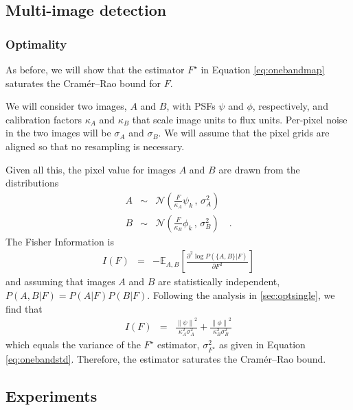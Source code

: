 \documentclass[letterpaper,preprint]{aastex62}
\newcommand{\drawnfrom}{\sim}
\newcommand{\gaussianN}{\mathcal{N}}
\newcommand{\gaussx}[2]{\gaussianN\!\left(#1 \, , \, #2\right)}
\newcommand{\norm}[1]{\left\lVert #1 \right\rVert}
\begin{document}
\subsection{Multi-image detection}
\label{app:multidet}

\subsubsection{Optimality}
\label{app:multiopt}
As before, we will show that the estimator $F^{\star}$ in
Equation \ref{eq:onebandmap} saturates the Cram\'er--Rao bound for $F$.

We will consider two images, $A$ and $B$, with PSFs $\psi$ and $\phi$,
respectively, and calibration factors $\kappa_A$ and $\kappa_B$ that
scale image units to flux units.  Per-pixel noise in the two images
will be $\sigma_A$ and $\sigma_B$.  We will assume that the pixel
grids are aligned so that no resampling is necessary.

Given all this, the pixel value for images $A$ and $B$ are drawn from
the distributions
\begin{eqnarray}
  A & \drawnfrom & \gaussx{\frac{F}{\kappa_A} \psi_k}{\sigma_A^2} \\
  B & \drawnfrom & \gaussx{\frac{F}{\kappa_B} \phi_k}{\sigma_B^2}
  \quad .
\end{eqnarray}
The Fisher Information is
\begin{eqnarray}
  I(F) &=& -\mathbb{E}_{A,B} \left[ \frac{\partial^2 \log P(\{ A,B \} | F)}{\partial F^2} \right]
\end{eqnarray}
and assuming that images $A$ and $B$ are statistically independent,
$P(A,B | F) = P(A|F) P(B|F)$.  Following the analysis in
\ref{sec:optsingle}, we find that
\begin{eqnarray}
  I(F) &=& \frac{\norm{\psi}^2}{\kappa_A^2 \sigma_A^2} +
  \frac{\norm{\phi}^2}{\kappa_B^2 \sigma_B^2}
\end{eqnarray}
which equals the variance of the $F^{\star}$ estimator,
$\sigma_{F^{\star}}^2$ as given in Equation \ref{eq:onebandstd}.
Therefore, the estimator saturates the Cram\'er--Rao bound.


\subsection{Experiments}
\end{document}
